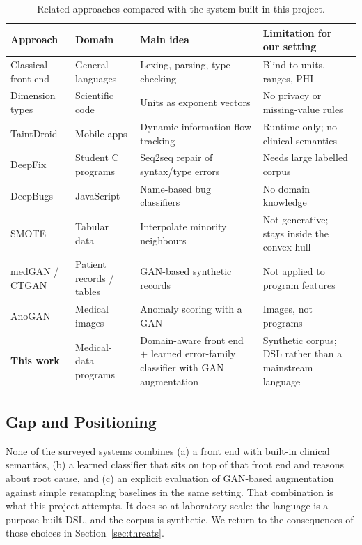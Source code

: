 \documentclass[conference]{IEEEtran}
\begin{document}
\begin{table}[t]
\centering
\caption{Related approaches compared with the system built in this project.}
\label{tab:survey}
\footnotesize
\begin{tabularx}{\textwidth}{p{2.6cm}p{2.5cm}Xp{3.0cm}}
\toprule
\textbf{Approach} & \textbf{Domain} & \textbf{Main idea} & \textbf{Limitation for our setting}\\
\midrule
Classical front end \cite{aho2006} & General languages & Lexing, parsing, type checking & Blind to units, ranges, PHI\\
Dimension types \cite{kennedy1994} & Scientific code & Units as exponent vectors & No privacy or missing-value rules\\
TaintDroid \cite{enck2010} & Mobile apps & Dynamic information-flow tracking & Runtime only; no clinical semantics\\
DeepFix \cite{gupta2017} & Student C programs & Seq2seq repair of syntax/type errors & Needs large labelled corpus\\
DeepBugs \cite{pradel2018} & JavaScript & Name-based bug classifiers & No domain knowledge\\
SMOTE \cite{chawla2002} & Tabular data & Interpolate minority neighbours & Not generative; stays inside the convex hull\\
medGAN / CTGAN \cite{choi2017,xu2019} & Patient records / tables & GAN-based synthetic records & Not applied to program features\\
AnoGAN \cite{schlegl2017} & Medical images & Anomaly scoring with a GAN & Images, not programs\\
\textbf{This work} & Medical-data programs & Domain-aware front end $+$ learned error-family classifier with GAN augmentation & Synthetic corpus; DSL rather than a mainstream language\\
\bottomrule
\end{tabularx}
\end{table}

\subsection{Gap and Positioning}

None of the surveyed systems combines (a) a front end with built-in clinical semantics, (b) a learned classifier that
sits on top of that front end and reasons about root cause, and (c) an explicit evaluation of GAN-based augmentation
against simple resampling baselines in the same setting. That combination is what this project attempts. It does so at
laboratory scale: the language is a purpose-built DSL, and the corpus is synthetic. We return to the consequences of
those choices in Section~\ref{sec:threats}.
\end{document}
